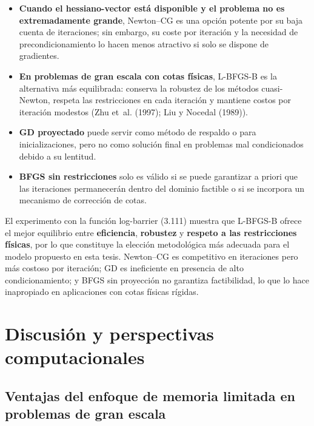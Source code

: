 \documentclass[
  spanish,
  us-letterpaper,
  DIV=11,
  numbers=noendperiod]{scrreprt}
\providecommand{\tightlist}{%
  \setlength{\itemsep}{0pt}\setlength{\parskip}{0pt}}
\numberwithin{equation}{section}
\begin{document}
\begin{itemize}
\tightlist
\item
  \textbf{Cuando el hessiano-vector está disponible y el problema no es
  extremadamente grande}, Newton--CG es una opción potente por su baja
  cuenta de iteraciones; sin embargo, su coste por iteración y la
  necesidad de precondicionamiento lo hacen menos atractivo si solo se
  dispone de gradientes.\\
\item
  \textbf{En problemas de gran escala con cotas físicas}, L-BFGS-B es la
  alternativa más equilibrada: conserva la robustez de los métodos
  cuasi-Newton, respeta las restricciones en cada iteración y mantiene
  costos por iteración modestos (Zhu et~al. (1997); Liu y Nocedal
  (1989)).\\
\item
  \textbf{GD proyectado} puede servir como método de respaldo o para
  inicializaciones, pero no como solución final en problemas mal
  condicionados debido a su lentitud.\\
\item
  \textbf{BFGS sin restricciones} solo es válido si se puede garantizar
  a priori que las iteraciones permanecerán dentro del dominio factible
  o si se incorpora un mecanismo de corrección de cotas.
\end{itemize}

El experimento con la función log-barrier (3.111) muestra que L-BFGS-B
ofrece el mejor equilibrio entre \textbf{eficiencia}, \textbf{robustez}
y \textbf{respeto a las restricciones físicas}, por lo que constituye la
elección metodológica más adecuada para el modelo propuesto en esta
tesis. Newton--CG es competitivo en iteraciones pero más costoso por
iteración; GD es ineficiente en presencia de alto condicionamiento; y
BFGS sin proyección no garantiza factibilidad, lo que lo hace
inapropiado en aplicaciones con cotas físicas rígidas.

\section{Discusión y perspectivas
computacionales}\label{discusiuxf3n-y-perspectivas-computacionales}

\subsection{Ventajas del enfoque de memoria limitada en problemas de
gran
escala}\label{ventajas-del-enfoque-de-memoria-limitada-en-problemas-de-gran-escala}
\end{document}
